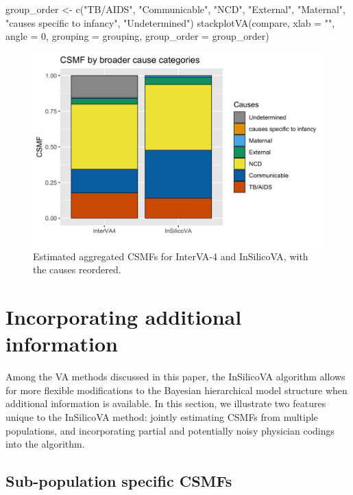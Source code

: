 \begin{Schunk}
\begin{Sinput}
group_order <- c("TB/AIDS",  "Communicable", "NCD", "External", "Maternal",
            "causes specific to infancy", "Undetermined") 
stackplotVA(compare, xlab = "", angle = 0, grouping = grouping, 
            group_order = group_order)
\end{Sinput}
\begin{figure}[!h]

{\centering \includegraphics[width=.7\linewidth,]{openVA-RJ-R1_files/figure-latex/vis-3-1} 

}

\caption[Estimated aggregated CSMFs for InterVA-4 and InSilicoVA, with the causes reordered]{Estimated aggregated CSMFs for InterVA-4 and InSilicoVA, with the causes reordered.}\label{fig:vis-3}
\end{figure}
\end{Schunk}

\hypertarget{incorporating-additional-information}{%
\section{Incorporating additional
information}\label{incorporating-additional-information}}

Among the VA methods discussed in this paper, the InSilicoVA algorithm
\citep{insilico} allows for more flexible modifications to the Bayesian
hierarchical model structure when additional information is available.
In this section, we illustrate two features unique to the InSilicoVA
method: jointly estimating CSMFs from multiple populations, and
incorporating partial and potentially noisy physician codings into the
algorithm.

\hypertarget{sub-population-specific-csmfs}{%
\subsection{Sub-population specific
CSMFs}\label{sub-population-specific-csmfs}}

